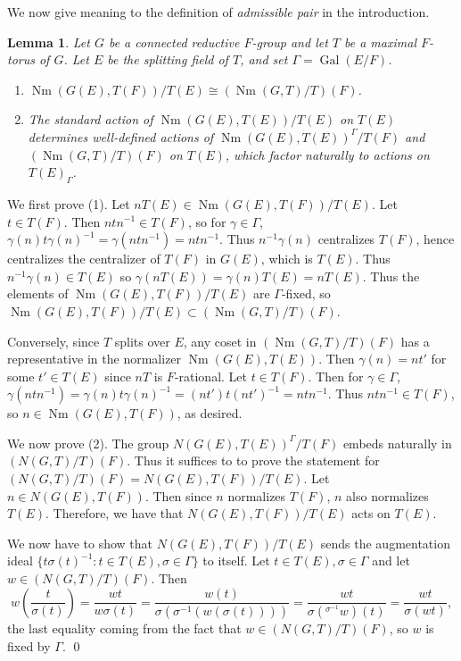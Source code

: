 \documentclass[11pt]{amsart}
\theoremstyle{plain}
\newtheorem{lemma}[theorem]{Lemma}
\theoremstyle{definition}
\DeclareMathOperator{\Gal}{Gal}
\DeclareMathOperator{\Nm}{Nm}
\begin{document}
We now give meaning to the definition of \emph{admissible pair} in the introduction.

\begin{lemma}\label{weylgroups}
Let $G$ be a connected reductive $F$-group and let $T$ be a maximal
$F$-torus of $G$.  Let $E$ be the splitting field of $T$, and set
$\Gamma = \Gal(E/F)$.
\begin{enumerate}
\item $\Nm(G(E), T(F)) / T(E) \cong (\Nm(G,T)/T)(F)$.
\item The standard action of $\Nm(G(E),T(E)) / T(E)$ on $T(E)$ determines
well-defined actions of $\Nm(G(E), T(E))^{\Gamma} / T(F)$ and $(\Nm(G,T)/T)(F)$
on $T(E)$, which factor naturally to actions on $T(E)_{\Gamma}$.
\end{enumerate}
\end{lemma}

\proof
We first prove (1).  Let $nT(E)\in \Nm(G(E), T(F)) / T(E)$.  Let $t\in T(F)$.
Then $ntn^{-1}\in T(F)$, so for $\gamma\in\Gamma$,
$\gamma(n)t\gamma(n)^{-1} =  \gamma (ntn^{-1}) = ntn^{-1}$.
Thus $n^{-1}\gamma(n)$ centralizes $T(F)$, hence centralizes the centralizer
of $T(F)$ in $G(E)$, which is $T(E)$. Thus $n^{-1}\gamma(n)\in T(E)$ so
$\gamma(n T(E)) = \gamma (n) T(E) = n T(E)$. Thus the elements of
$\Nm(G(E), T(F)) / T(E)$ are $\Gamma$-fixed, so
$\Nm(G(E), T(F)) / T(E) \subset (\Nm(G,T)/T)(F)$.

Conversely, since $T$ splits over $E$, any coset in $(\Nm(G,T)/T)(F)$
has a representative in the normalizer $\Nm(G(E), T(E))$. Then $\gamma(n) = nt'$
for some $t'\in T(E)$ since $nT$ is $F$-rational.  Let $t\in T(F)$.
Then for $\gamma\in\Gamma$,
$\gamma(ntn^{-1}) = \gamma(n) t \gamma(n)^{-1} = (nt')t(nt')^{-1} = ntn^{-1}$.
Thus $ntn^{-1}\in T(F)$, so $n\in \Nm(G(E),T(F))$, as desired.

We now prove (2).
The group $N(G(E), T(E))^{\Gamma} / T(F)$ embeds naturally in $(N(G,T)/T)(F)$.
Thus it suffices to to prove the statement for
$(N(G,T)/T)(F) = N(G(E), T(F)) / T(E)$.  Let $n \in N(G(E),T(F))$.  Then since $n$
normalizes $T(F)$, $n$ also normalizes $T(E)$.  Therefore, we have that
$N(G(E), T(F)) / T(E)$ acts on $T(E)$.

We now have to show that $N(G(E), T(F)) / T(E)$
sends the augmentation ideal
$\{ t\sigma(t)^{-1} : t \in T(E), \sigma \in \Gamma \}$ to itself.
Let $t \in T(E), \sigma \in \Gamma$ and let $w \in  (N(G,T)/T)(F)$.  Then $$w\left(\frac{t}{\sigma(t)}\right)
= \frac{wt}{w \sigma(t)} = \frac{w(t)}{\sigma (\sigma^{-1}(w(\sigma(t))))} =
\frac{wt}{\sigma ({}^{\sigma^{-1}} w) (t)} = \frac{wt}{\sigma(wt)},$$
the last equality coming from the fact that $w \in (N(G,T)/T)(F)$, so $w$
is fixed by $\Gamma$.
\qed
\end{document}
